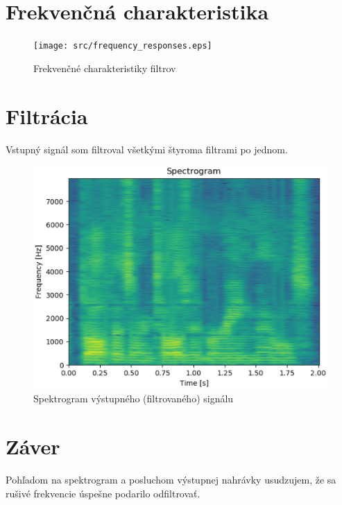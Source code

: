 \documentclass{article}
\begin{document}
  \section{Frekvenčná charakteristika}

  \begin{figure}[H]
    \centering
    \texttt{[image: src/frequency\_responses.eps]}
    \caption{Frekvenčné charakteristiky filtrov}
  \end{figure}


  \newpage
  \section{Filtrácia}

  Vstupný signál som filtroval všetkými štyroma filtrami po jednom.

  \begin{figure}[H]
    \includegraphics[width=\textwidth]{src/spectrogram_output.eps}
    \caption{Spektrogram výstupného (filtrovaného) signálu}
  \end{figure}

  \section{Záver}

  Pohľadom na spektrogram a posluchom výstupnej nahrávky usudzujem, že sa 
  rušivé frekvencie úspešne podarilo odfiltrovať.
\end{document}
